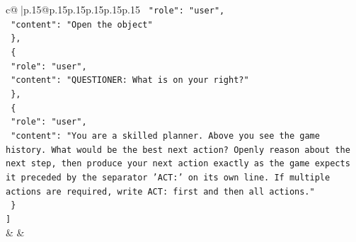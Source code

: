 \documentclass{article}
\begin{document}
{\begin{supertabular}{c@{$\;$}|p{.15\linewidth}@{}p{.15\linewidth}p{.15\linewidth}p{.15\linewidth}p{.15\linewidth}p{.15\linewidth}}
{{{\texttt{    "role": "user",} \\
\texttt{    "content": "Open the object"} \\
\texttt{  \},} \\
\texttt{  \{} \\
\texttt{    "role": "user",} \\
\texttt{    "content": "QUESTIONER: What is on your right?"} \\
\texttt{  \},} \\
\texttt{  \{} \\
\texttt{    "role": "user",} \\
\texttt{    "content": "You are a skilled planner. Above you see the game history. What would be the best next action? Openly reason about the next step, then produce your next action exactly as the game expects it preceded by the separator 'ACT:' on its own line. If multiple actions are required, write ACT: first and then all actions."} \\
\texttt{  \}} \\
\texttt{{]}} \\
            }
        }
    }
    & & \\ \\


\end{supertabular}}
\end{document}
